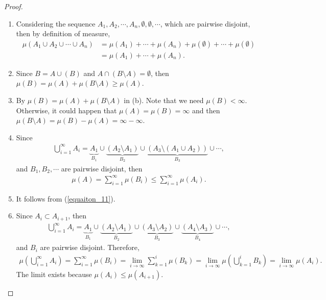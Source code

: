 \documentclass[11pt]{book}
\theoremstyle{definition}
\numberwithin{equation}{chapter}
\begin{document}
\begin{proof}
~\begin{enumerate}[label=(\alph*)]
    \item Considering the sequence $A_1, A_2, \cdots, A_n, \emptyset, \emptyset, \cdots$, which are pairwise disjoint, then by definition of measure, \begin{align*}
        \mu(A_1 \cup A_2 \cup \cdots \cup A_n) & = \mu(A_1) + \cdots + \mu(A_n) + \mu(\emptyset) + \cdots + \mu(\emptyset) \\
        & = \mu(A_1) + \cdots + \mu(A_n).
    \end{align*}
    
    \item Since $B = A \cup (B)$ and $A \cap (B \setminus A) = \emptyset$, then $\mu(B) = \mu(A) + \mu(B \setminus A) \geq \mu(A)$.
    
    \item By $\mu(B) = \mu(A) + \mu(B \setminus A)$ in (b). Note that we need $\mu(B) < \infty$. Otherwise, it could happen that $\mu(A) = \mu(B) = \infty$ and then $\mu(B \setminus A) = \mu(B) - \mu(A) = \infty - \infty$.
    
    \item Since
    \begin{align*}
        \bigcup^\infty_{i=1} A_i = \underbrace{A_1}_{B_1} \cup \underbrace{(A_2\setminus A_1)}_{B_2} \cup \underbrace{(A_3 \setminus (A_1\cup A_2))}_{B_3} \cup \cdots,
    \end{align*}
    and $B_1, B_2, \cdots$ are pairwise disjoint, then 
    \begin{align}\label{equaiton_11}
        \mu(A) = \sum^\infty_{i=1} \mu(B_i) \leq \sum^\infty_{i=1} \mu(A_i).
    \end{align}
    
    \item It follows from (\ref{equaiton_11}).
    
    \item Since $A_i \subset A_{i+1}$, then 
    \begin{align*}
        \bigcup^\infty_{i=1} A_i =  \underbrace{A_1}_{B_1} \cup \underbrace{(A_2\setminus A_1)}_{B_2} \cup \underbrace{(A_3 \setminus A_2)}_{B_3} \cup \underbrace{(A_4 \setminus A_3)}_{B_4} \cup \cdots,
    \end{align*}
    and $B_i$ are pairwise disjoint. Therefore,
    \begin{align*}
        \mu \left(\bigcup^\infty_{i=1} A_i \right) = \sum^\infty_{i=1} \mu(B_i) = \lim_{i\to\infty} \sum^i_{k=1} \mu(B_k) = \lim_{i\to\infty} \mu \left(\bigcup^i_{k=1} B_k \right) = \lim_{i\to\infty} \mu(A_i).
    \end{align*}
    The limit exists because $\mu(A_i) \leq \mu(A_{i+1})$.
    

\end{enumerate}
\end{proof}
\end{document}
